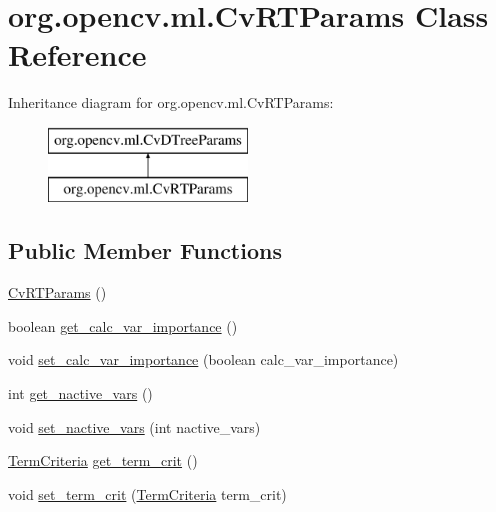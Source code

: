 \hypertarget{classorg_1_1opencv_1_1ml_1_1_cv_r_t_params}{}\section{org.\+opencv.\+ml.\+Cv\+R\+T\+Params Class Reference}
\label{classorg_1_1opencv_1_1ml_1_1_cv_r_t_params}
Inheritance diagram for org.\+opencv.\+ml.\+Cv\+R\+T\+Params\+:\begin{figure}[H]
\begin{center}
\leavevmode
\includegraphics[height=2.000000cm]{classorg_1_1opencv_1_1ml_1_1_cv_r_t_params}
\end{center}
\end{figure}
\subsection*{Public Member Functions}
\begin{DoxyCompactItemize}
\item 
\mbox{\hyperlink{classorg_1_1opencv_1_1ml_1_1_cv_r_t_params_ac7f87227058e7ff439158f3887e6dfe1}{Cv\+R\+T\+Params}} ()
\item 
boolean \mbox{\hyperlink{classorg_1_1opencv_1_1ml_1_1_cv_r_t_params_a95fd2a9f538490f55834b3f30d422b0a}{get\+\_\+calc\+\_\+var\+\_\+importance}} ()
\item 
void \mbox{\hyperlink{classorg_1_1opencv_1_1ml_1_1_cv_r_t_params_aea663a4ea3f5e21e6b881d21be36cef3}{set\+\_\+calc\+\_\+var\+\_\+importance}} (boolean calc\+\_\+var\+\_\+importance)
\item 
int \mbox{\hyperlink{classorg_1_1opencv_1_1ml_1_1_cv_r_t_params_aba88508e0e9f6e815825e40476548457}{get\+\_\+nactive\+\_\+vars}} ()
\item 
void \mbox{\hyperlink{classorg_1_1opencv_1_1ml_1_1_cv_r_t_params_a1860043aa9f6811b1e842486251e5bb1}{set\+\_\+nactive\+\_\+vars}} (int nactive\+\_\+vars)
\item 
\mbox{\hyperlink{classorg_1_1opencv_1_1core_1_1_term_criteria}{Term\+Criteria}} \mbox{\hyperlink{classorg_1_1opencv_1_1ml_1_1_cv_r_t_params_abcf3e27537a460b18af04fae5d60e990}{get\+\_\+term\+\_\+crit}} ()
\item 
void \mbox{\hyperlink{classorg_1_1opencv_1_1ml_1_1_cv_r_t_params_a4bd98b6240d83fd415b87102b55f7909}{set\+\_\+term\+\_\+crit}} (\mbox{\hyperlink{classorg_1_1opencv_1_1core_1_1_term_criteria}{Term\+Criteria}} term\+\_\+crit)
\end{DoxyCompactItemize}
